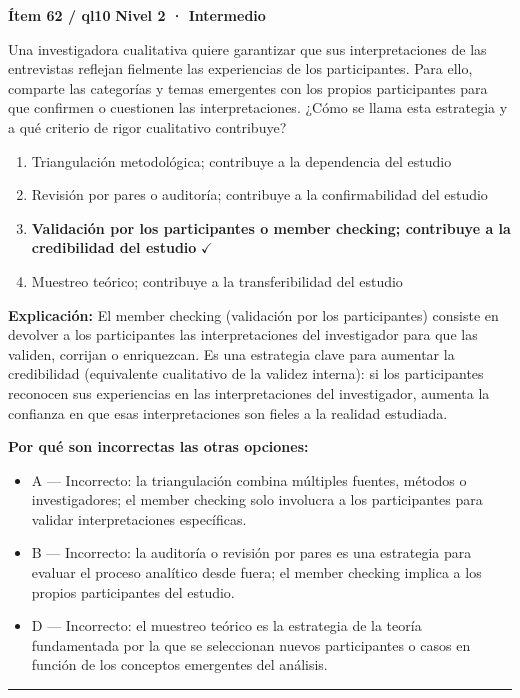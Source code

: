 \documentclass[12pt,a4paper]{article}
\begin{document}
\begin{mdframed}[backgroundcolor=fondogris,linecolor=ambar,linewidth=1pt,innerleftmargin=10pt,innerrightmargin=10pt,innertopmargin=7pt,innerbottommargin=7pt]
\textbf{Ítem 62 / ql10} \hfill {\small\bfseries\color{ambar} Nivel 2 · Intermedio}
\end{mdframed}

Una investigadora cualitativa quiere garantizar que sus interpretaciones de las entrevistas reflejan fielmente las experiencias de los participantes. Para ello, comparte las categorías y temas emergentes con los propios participantes para que confirmen o cuestionen las interpretaciones. ¿Cómo se llama esta estrategia y a qué criterio de rigor cualitativo contribuye?

\begin{enumerate}
  \item[A.] Triangulación metodológica; contribuye a la dependencia del estudio
  \item[B.] Revisión por pares o auditoría; contribuye a la confirmabilidad del estudio
  \item[\textbf{\color{verde}C.}] \textbf{\color{verde} Validación por los participantes o member checking; contribuye a la credibilidad del estudio} \hfill $\checkmark$
  \item[D.] Muestreo teórico; contribuye a la transferibilidad del estudio
\end{enumerate}

\noindent\textbf{\color{azul}Explicación:} El member checking (validación por los participantes) consiste en devolver a los participantes las interpretaciones del investigador para que las validen, corrijan o enriquezcan. Es una estrategia clave para aumentar la credibilidad (equivalente cualitativo de la validez interna): si los participantes reconocen sus experiencias en las interpretaciones del investigador, aumenta la confianza en que esas interpretaciones son fieles a la realidad estudiada.

\noindent\textbf{\color{gris}Por qué son incorrectas las otras opciones:}
\begin{itemize}
  \item {\small A — Incorrecto: la triangulación combina múltiples fuentes, métodos o investigadores; el member checking solo involucra a los participantes para validar interpretaciones específicas.}
  \item {\small B — Incorrecto: la auditoría o revisión por pares es una estrategia para evaluar el proceso analítico desde fuera; el member checking implica a los propios participantes del estudio.}
  \item {\small D — Incorrecto: el muestreo teórico es la estrategia de la teoría fundamentada por la que se seleccionan nuevos participantes o casos en función de los conceptos emergentes del análisis.}
\end{itemize}
\vspace{8pt}\hrule\vspace{10pt}
\end{document}
